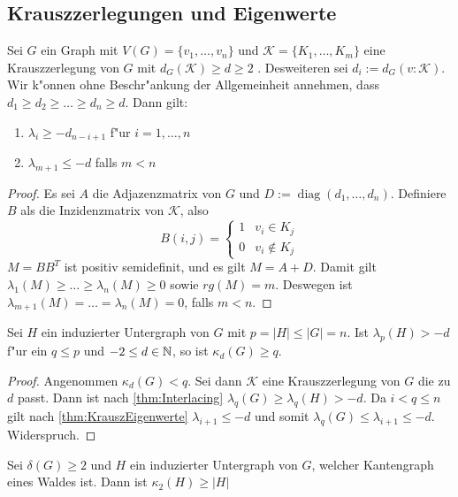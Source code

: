 \subsection{Krauszzerlegungen und Eigenwerte}
\begin{theorem}
    \label{thm:KrauszEigenwerte}
    Sei $G$ ein Graph mit $V(G)=\{v_1,\dots,v_n\}$ und $\mathcal K=\{K_1,\dots,K_m\}$ eine Krauszzerlegung von $G$ mit $d_G(\mathcal K) \geq d \geq 2$ . Desweiteren sei $d_i := d_G(v:\mathcal K)$. 
    Wir k"onnen ohne Beschr"ankung der Allgemeinheit annehmen, dass $d_1\geq d_2 \geq \dots \geq d_n \geq d$.
    Dann gilt: 
    \begin{enumerate}[label=(\alph*)]
        \item $\lambda_i \geq -d_{n-i+1}$ f"ur $i = 1, \dots , n$
        \item $\lambda_{m+1} \leq -d$ falls $m < n$
    \end{enumerate}
\end{theorem}
\begin{proof}
    Es sei $A$ die Adjazenzmatrix von $G$ und $D := \operatorname{diag}(d_1,\dots,d_n)$. Definiere $B$ als die Inzidenzmatrix von $\mathcal K$, also $$B(i,j) = \begin{cases}
        1 & v_i \in K_j \\ 0 & v_i \notin K_j
    \end{cases}$$ 
    $M=BB^{T}$ ist positiv semidefinit, und es gilt $M = A+D$. Damit gilt $\lambda_1(M) \geq \dots \geq \lambda_n(M) \geq 0$ sowie $rg(M) = m$. Deswegen ist $\lambda_{m+1}(M)=\dots=\lambda_n(M) = 0$, falls $m < n$. 
\end{proof}
\begin{corollary}
    \label{cor:Korollar1}
    Sei $H$ ein induzierter Untergraph von $G$ mit $p = \left| H\right| \leq \left|G\right| = n$.
    Ist $\lambda_p (H) > -d $ f"ur ein $q \leq p$ und $-2 \leq d \in {\mathbb{N}}$, so ist $\kappa_d(G) \geq q$.
\end{corollary}
\begin{proof}
    Angenommen $\kappa_d(G) < q$. Sei dann $\mathcal{K}$ eine Krauszzerlegung von $G$ die zu $d$ passt. Dann ist nach \ref{thm:Interlacing} $\lambda_{q}(G)\geq \lambda_{q}(H) > -d$. 
    Da $i < q \leq n$ gilt nach \ref{thm:KrauszEigenwerte} $\lambda_{i+1}\leq -d$ und somit $\lambda_{q}(G)\leq \lambda_{i+1} \leq -d$. Widerspruch.
\end{proof}

\begin{corollary}
    Sei $\delta(G) \geq 2$ und $H$ ein induzierter Untergraph von $G$, welcher Kantengraph eines Waldes ist. 
    Dann ist $\kappa_{2}(H)\geq \left|H\right|$
\end{corollary}

